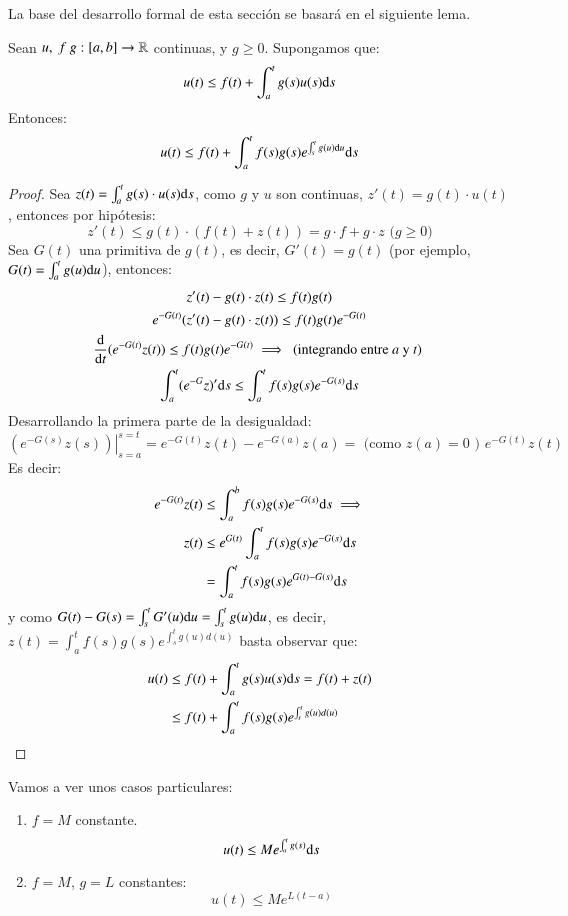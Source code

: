 La base del desarrollo formal de esta sección se basará en el siguiente lema.
\begin{lm}[de Gronwal]
    Sean $u,\ f\ g: [a, b] \to \mathbb{R}$ continuas, y $g \geq 0$. Supongamos que:
    $$
        u(t) \leq f(t) + \int_a^t g(s) u(s) \mathrm{d} s
    $$
    Entonces:
    $$
        u(t) \leq f(t) + \int_a^t f(s) g(s) e^{\int_s^t g(u) \mathrm{d} u} \mathrm{d} s
    $$
\end{lm}
\begin{proof}
    Sea $z(t) = \int_a^t g(s)\cdot u(s) \mathrm{d} s$, como $g$ y $u$ son continuas, $z'(t) = g(t)\cdot u(t)$, entonces por hipótesis:
    $$
        z'(t) \leq g(t) \cdot (f(t) + z(t)) = g\cdot f + g\cdot z \text{ ($g \geq 0$)}
    $$
    Sea $G(t)$ una primitiva de $g(t)$, es decir, $G'(t) = g(t)$ (por ejemplo, $G(t) = \int_a^t g(u) \mathrm{d} u$), entonces:
    \begin{gather*}
        z'(t) - g(t) \cdot z(t) \leq f(t) g(t) \\
        e^{-G(t)} (z'(t) - g(t) \cdot z(t)) \leq f(t) g(t) e^{-G(t)}\\
        \frac{\mathrm{d}}{\mathrm{d}t} (e^{-G(t)} z(t) ) \leq f(t) g(t) e^{-G(t)} \implies \text{ (integrando entre $a$ y $t$) }\\
        \int_a^t (e^{-G}z)' \mathrm{d} s \leq \int_a^t f(s)g(s)e^{-G(s)} \mathrm{d} s
    \end{gather*}
    Desarrollando la primera parte de la desigualdad:
    $$
    \left. (e^{-G(s)}z(s)) \right|_{s=a}^{s=t} = e^{-G(t)}z(t) - e^{-G(a)}z(a) = \text{ (como $z(a) = 0$ ) } e^{-G(t)}z(t)
    $$
    Es decir:
    \begin{align*}
        e^{-G(t)}z(t) &\leq \int_{a}^b f(s) g(s) e^{-G(s)} \mathrm{d} s \implies\\
        z(t) &\leq e^{G(t)} \int_a^t f(s) g(s) e^{-G(s)} \mathrm{d} s\\
        &= \int_a^t f(s) g(s) e^{G(t) - G(s)} \mathrm{d} s
    \end{align*}
    y como $G(t) - G(s) = \int_s^t G'(u) \mathrm{d} u = \int_s^t g(u) \mathrm{d} u$, es decir, $z(t) = \int_a^t f(s) g(s) e^{\int_s^t g(u) d(u)}$ basta observar que:
    \begin{align*}
        u(t) &\leq f(t) + \int_a^t g(s) u(s) \mathrm{d} s = f(t) + z(t)\\
             &\leq f(t) + \int_a^t f(s) g(s) e^{\int_s^t g(u) d(u)}
    \end{align*}
\end{proof}
\begin{obs}
    Vamos a ver unos casos particulares:
    \begin{enumerate}
        \item $f = M$ constante.
        $$
            u(t) \leq M e^{\int_a^t g(s)} \mathrm{d} s
        $$
        \item $f = M$, $g = L$ constantes:
        $$
            u(t) \leq M e^{L(t-a)}
        $$
    \end{enumerate}
\end{obs}
